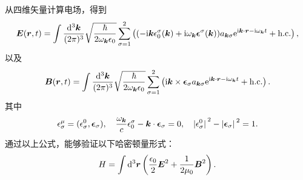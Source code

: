 \documentclass[UTF8, a4paper]{ctexart}
\newcommand*{\ee}{\mathrm{e}}
\newcommand*{\ii}{\mathrm{i}}
\begin{document}
从四维矢量计算电场，得到
\begin{equation}
    \vb*{E}(\vb*{r}, t) = \int \frac{\dd[3]{\vb*{k}}}{(2\pi)^3} \sqrt{\frac{\hbar}{2\omega_{\vb*{k}} \epsilon_0}} \sum_{\sigma=1}^2 \left( (- \ii \vb*{k} \epsilon_0^\sigma(\vb*{k}) + \ii \omega_{\vb*{k}} \vb*{\epsilon}^\sigma(\vb*{k})) a_{\vb*{k} \sigma} \ee^{\ii \vb*{k} \cdot \vb*{r} - \ii \omega_{\vb*{k}} t} + \text{h.c.} \right),
\end{equation}
以及
\begin{equation}
    \vb*{B}(\vb*{r}, t) = \int \frac{\dd[3]{\vb*{k}}}{(2\pi)^3} \sqrt{\frac{\hbar}{2\omega_{\vb*{k}} \epsilon_0}} \sum_{\sigma=1}^2 \left( \ii \vb*{k} \times \vb*{\epsilon}_\sigma a_{\vb*{k} \sigma} \ee^{\ii \vb*{k} \cdot \vb*{r} - \ii \omega_{\vb*{k}} t } + \text{h.c.} \right).
\end{equation}
其中
\begin{equation}
    \epsilon^\mu_\sigma = (\epsilon_\sigma^0, \vb*{\epsilon}_\sigma), \quad \frac{\omega_{\vb*{k}}}{c} \epsilon_0^\sigma - \vb*{k} \cdot \vb*{\epsilon}_\sigma = 0, \quad \abs*{\epsilon_\sigma^0}^2 - \abs*{\vb*{\epsilon}_\sigma}^2 = 1.
\end{equation}
通过以上公式，能够验证以下哈密顿量形式：
\begin{equation}
    H = \int \dd[3]{\vb*{r}} \left( \frac{\epsilon_0}{2} \vb*{E}^2 + \frac{1}{2\mu_0} \vb*{B}^2 \right).
    \label{eq:e-and-b-hamiltonian}
\end{equation}
\end{document}
